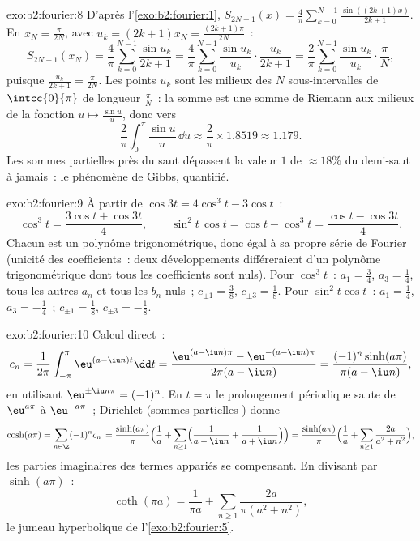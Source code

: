 \begin{solution}{exo:b2:fourier:8}
D'après l'\cref{exo:b2:fourier:1}, $S_{2N-1}(x) =
\frac4\pi\sum_{k=0}^{N-1}\frac{\sin((2k+1)x)}{2k+1}$. En $x_N =
\frac{\pi}{2N}$, avec $u_k = (2k+1)x_N = \frac{(2k+1)\pi}{2N}$~:
\[
S_{2N-1}(x_N) = \frac{4}{\pi}\sum_{k=0}^{N-1}\frac{\sin u_k}{2k+1}
= \frac{4}{\pi}\sum_{k=0}^{N-1}\frac{\sin u_k}{u_k}\cdot
\frac{u_k}{2k+1}
= \frac{2}{\pi}\sum_{k=0}^{N-1}\frac{\sin u_k}{u_k}\cdot
\frac{\pi}{N},
\]
puisque $\frac{u_k}{2k+1} = \frac{\pi}{2N}$. Les points $u_k$ sont
les milieux des $N$ sous-intervalles de $\intcc{0}{\pi}$ de longueur
$\frac{\pi}{N}$~: la somme est une somme de Riemann aux milieux de la
fonction  $u \mapsto \frac{\sin u}{u}$, donc  vers
\[
\frac{2}{\pi}\int_0^\pi \frac{\sin u}{u}\,\dd u
\approx \frac{2}{\pi}\times 1.8519 \approx 1.179 .
\]
Les sommes partielles près du saut dépassent la valeur $1$ de
$\approx 18\%$ du demi-saut à jamais~: le phénomène de Gibbs,
quantifié.
\end{solution}

\begin{solution}{exo:b2:fourier:9}
À partir de $\cos 3t = 4\cos^3t - 3\cos t$~:
\[
\cos^3 t = \frac{3\cos t + \cos 3t}{4},
\qquad
\sin^2t\,\cos t = \cos t - \cos^3 t
= \frac{\cos t - \cos 3t}{4} .
\]
Chacun est un polynôme trigonométrique, donc égal à sa propre série
de Fourier (unicité des coefficients~: deux développements
différeraient d'un polynôme trigonométrique dont tous les
coefficients sont nuls). Pour $\cos^3t$~: $a_1 = \frac34$, $a_3 =
\frac14$, tous les autres $a_n$ et tous les $b_n$ nuls~; $c_{\pm1} =
\frac38$, $c_{\pm3} = \frac18$. Pour $\sin^2t\cos t$~: $a_1 =
\frac14$, $a_3 = -\frac14$~; $c_{\pm1} = \frac18$, $c_{\pm3} =
-\frac18$.
\end{solution}

\begin{solution}{exo:b2:fourier:10}
Calcul direct~:
\[
c_n = \frac{1}{2\pi}\int_{-\pi}^{\pi}\eu^{(a - \iu n)t}\dd t
= \frac{\eu^{(a-\iu n)\pi} - \eu^{-(a - \iu n)\pi}}
{2\pi(a - \iu n)}
= \frac{(-1)^n\sinh(a\pi)}{\pi(a - \iu n)} ,
\]
en utilisant $\eu^{\pm\iu n\pi} = (-1)^n$. En $t = \pi$ le
prolongement périodique saute de $\eu^{a\pi}$ à $\eu^{-a\pi}$~;
Dirichlet (sommes partielles ) donne
\[
\cosh(a\pi) = \sum_{n\in\Z}(-1)^n c_n\,
= \frac{\sinh(a\pi)}{\pi}\Bigl(\frac1a +
\sum_{n\geq1}\Bigl(\frac{1}{a - \iu n} +
\frac{1}{a + \iu n}\Bigr)\Bigr)
= \frac{\sinh(a\pi)}{\pi}\Bigl(\frac1a +
\sum_{n\geq1}\frac{2a}{a^2 + n^2}\Bigr) ,
\]
les parties imaginaires des termes appariés se compensant. En
divisant par $\sinh(a\pi)$~:
\[
\coth(\pi a) = \frac{1}{\pi a} +
\sum_{n\geq1}\frac{2a}{\pi(a^2 + n^2)} ,
\]
le jumeau hyperbolique de l'\cref{exo:b2:fourier:5}.
\end{solution}

